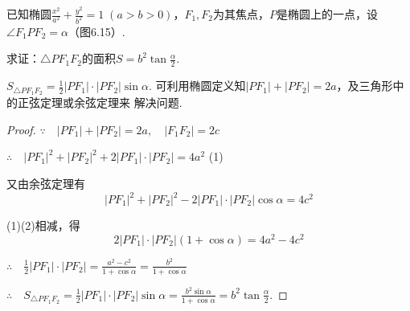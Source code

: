 \noindent
\begin{minipage}{.55\textwidth}

\begin{example}
已知椭圆$\frac{x^2}{a^2}+\frac{y^2}{b^2}=1\; (a>b>0)$，$F_1,F_2$为其焦点，$P$是椭圆上的一点，设$\angle F_1PF_2=\alpha$（图6.15）.

求证：$\triangle PF_1F_2$的面积$S=b^2\tan\frac{\alpha}{2}$.
\end{example}

\begin{analyze}
$S_{\triangle PF_1F_2}=\frac{1}{2}|PF_1|\cdot |PF_2|\sin\alpha$. 可利用椭圆定义知$|PF_1|+|PF_2|=2a$，及三角形中的正弦定理或余弦定理来
解决问题.
\end{analyze}
\end{minipage}\hfill
\begin{minipage}{.43\textwidth}
    \centering
{}    
\end{minipage}

\begin{proof}
$\because\quad |PF_1|+|PF_2|=2a, \quad |F_1F_2|=2c$

$\therefore\quad |PF_1|^2+|PF_2|^2+2|PF_1|\cdot |PF_2|=4a^2$ \hfill(1)

又由余弦定理有
\begin{equation}
   |PF_1|^2+|PF_2|^2-2|PF_1|\cdot |PF_2|\cos\alpha=4c^2  \tag{2}
\end{equation}

(1)(2)相减，得
\[2|PF_1|\cdot |PF_2|(1+\cos\alpha)=4a^2-4c^2\]

$\therefore\quad \frac{1}{2}|PF_1|\cdot |PF_2|=\frac{a^2-c^2}{1+\cos\alpha}=\frac{b^2}{1+\cos\alpha}$

$\therefore\quad S_{\triangle PF_1F_2}=\frac{1}{2}|PF_1|\cdot |PF_2|\sin\alpha=\frac{b^2\sin\alpha}{1+\cos\alpha}=b^2\tan\frac{\alpha}{2}$.
\end{proof}

